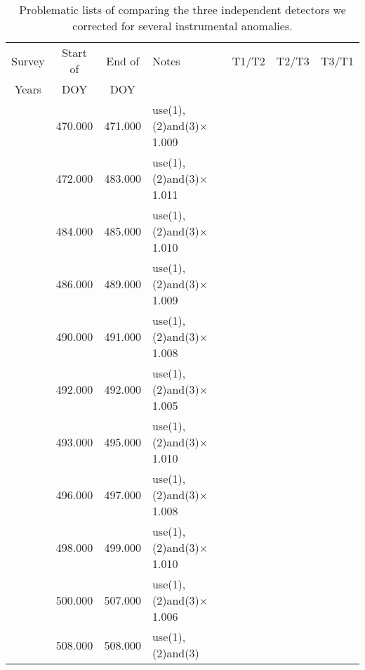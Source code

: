 \begin{table}[!h]
\caption{Problematic lists of comparing the three independent
detectors we corrected for several instrumental anomalies.}
\label{problematiclists3}
    \begin{tabular}{ | c | c | c | p{5.5cm} | c | c | c |}
    \hline
    Survey & Start of & End of & Notes & T1/T2 & T2/T3 & T3/T1 \\ %
    Years & DOY & DOY &  &  &  &  \\ \hline
    &   470.000 &   471.000 &   use(1),(2)and(3)$\times$1.009  &       &       &       \\
    &   472.000 &   483.000 &   use(1),(2)and(3)$\times$1.011  &       &       &       \\
    &   484.000 &   485.000 &   use(1),(2)and(3)$\times$1.010  &       &       &       \\
    &   486.000 &   489.000 &   use(1),(2)and(3)$\times$1.009  &       &       &       \\
    &   490.000 &   491.000 &   use(1),(2)and(3)$\times$1.008  &       &       &       \\
    &   492.000 &   492.000 &   use(1),(2)and(3)$\times$1.005  &       &       &       \\
    &   493.000 &   495.000 &   use(1),(2)and(3)$\times$1.010  &       &       &       \\
    &   496.000 &   497.000 &   use(1),(2)and(3)$\times$1.008  &       &       &       \\
    &   498.000 &   499.000 &   use(1),(2)and(3)$\times$1.010  &       &       &       \\
    &   500.000 &   507.000 &   use(1),(2)and(3)$\times$1.006  &       &       &       \\
    &   508.000 &   508.000 &   use(1),(2)and(3) &       &       &       \\
    \hline

    \end{tabular}
\end{table}







